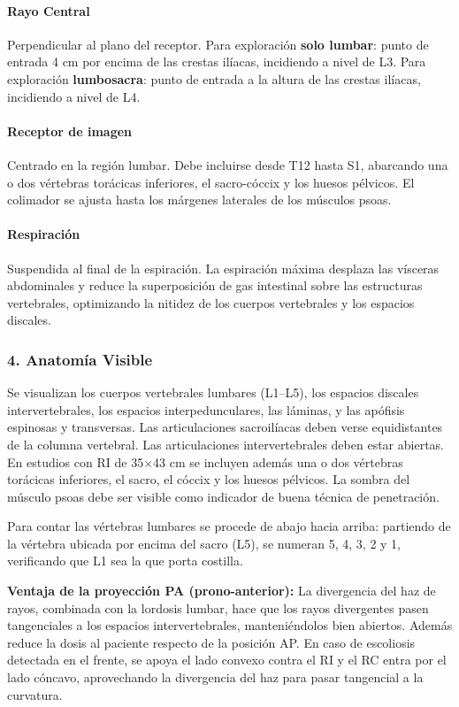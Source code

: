 		\paragraph{Rayo Central}
		Perpendicular al plano del receptor. Para exploración \textbf{solo lumbar}: punto de entrada 4 cm por encima de las crestas ilíacas, incidiendo a nivel de L3. Para exploración \textbf{lumbosacra}: punto de entrada a la altura de las crestas ilíacas, incidiendo a nivel de L4.
		
		\paragraph{Receptor de imagen}
		Centrado en la región lumbar. Debe incluirse desde T12 hasta S1, abarcando una o dos vértebras torácicas inferiores, el sacro-cóccix y los huesos pélvicos. El colimador se ajusta hasta los márgenes laterales de los músculos psoas.
		
		\paragraph{Respiración}
		Suspendida al final de la espiración. La espiración máxima desplaza las vísceras abdominales y reduce la superposición de gas intestinal sobre las estructuras vertebrales, optimizando la nitidez de los cuerpos vertebrales y los espacios discales.
		
		\subsubsection*{4. Anatomía Visible}
		
		Se visualizan los cuerpos vertebrales lumbares (L1--L5), los espacios discales intervertebrales, los espacios interpedunculares, las láminas, y las apófisis espinosas y transversas. Las articulaciones sacroilíacas deben verse equidistantes de la columna vertebral. Las articulaciones intervertebrales deben estar abiertas. En estudios con RI de 35$\times$43 cm se incluyen además una o dos vértebras torácicas inferiores, el sacro, el cóccix y los huesos pélvicos. La sombra del músculo psoas debe ser visible como indicador de buena técnica de penetración.
		
		Para contar las vértebras lumbares se procede de abajo hacia arriba: partiendo de la vértebra ubicada por encima del sacro (L5), se numeran 5, 4, 3, 2 y 1, verificando que L1 sea la que porta costilla.
		
		\textbf{Ventaja de la proyección PA (prono-anterior):} La divergencia del haz de rayos, combinada con la lordosis lumbar, hace que los rayos divergentes pasen tangenciales a los espacios intervertebrales, manteniéndolos bien abiertos. Además reduce la dosis al paciente respecto de la posición AP. En caso de escoliosis detectada en el frente, se apoya el lado convexo contra el RI y el RC entra por el lado cóncavo, aprovechando la divergencia del haz para pasar tangencial a la curvatura.
		
